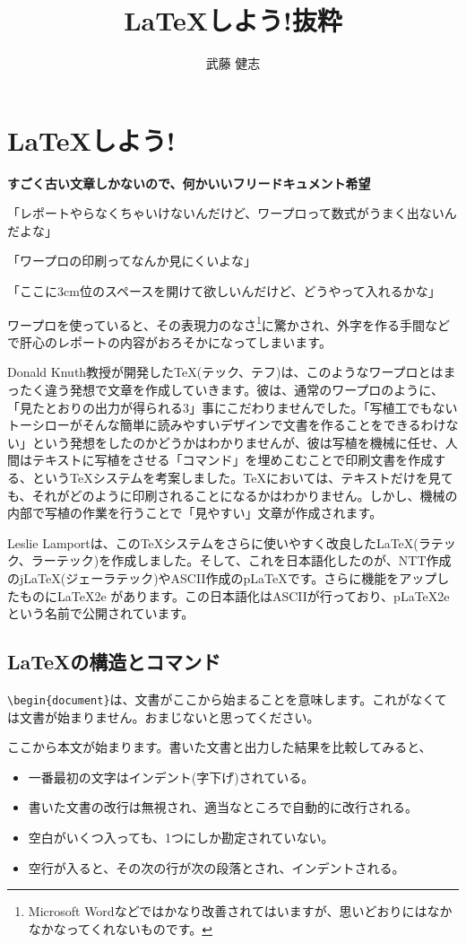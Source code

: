 \documentclass{jsbook}
\title{LaTeXしよう!抜粋}
\author{武藤 健志}
\begin{document}
\chapter{LaTeXしよう!}
\label{chap:latex}

\textbf{すごく古い文章しかないので、何かいいフリードキュメント希望}

「レポートやらなくちゃいけないんだけど、ワープロって数式がうまく出ないんだよな」

「ワープロの印刷ってなんか見にくいよな」

「ここに3cm位のスペースを開けて欲しいんだけど、どうやって入れるかな」

ワープロを使っていると、その表現力のなさ\footnote{Microsoft Wordなどではかなり改善されてはいますが、思いどおりにはなかなかなってくれないものです。}に驚かされ、外字を作る手間などで肝心のレポートの内容がおろそかになってしまいます。

Donald Knuth教授が開発した\TeX (テック、テフ)は、このようなワープロとはまったく違う発想で文章を作成していきます。彼は、通常のワープロのように、「見たとおりの出力が得られる3」事にこだわりませんでした。「写植工でもないトーシローがそんな簡単に読みやすいデザインで文書を作ることをできるわけない」という発想をしたのかどうかはわかりませんが、彼は写植を機械に任せ、人間はテキストに写植をさせる「コマンド」を埋めこむことで印刷文書を作成する、という\TeX システムを考案しました。\TeX においては、テキストだけを見ても、それがどのように印刷されることになるかはわかりません。しかし、機械の内部で写植の作業を行うことで「見やすい」文章が作成されます。 

Leslie Lamportは、この\TeX システムをさらに使いやすく改良した\LaTeX (ラテック、ラーテック)を作成しました。そして、これを日本語化したのが、NTT作成のj\LaTeX (ジェーラテック)やASCII作成のp\LaTeX  です。さらに機能をアップしたものに\LaTeX2e があります。この日本語化はASCIIが行っており、p\LaTeX2e という名前で公開されています。 

\section{LaTeXの構造とコマンド}
\label{sec:latexcmd}

\verb+\begin{document}+は、文書がここから始まることを意味します。これがなくては文書が始まりません。おまじないと思ってください。

ここから本文が始まります。書いた文書と出力した結果を比較してみると、

\begin{itemize}
\item 一番最初の文字はインデント(字下げ)されている。
\item 書いた文書の改行は無視され、適当なところで自動的に改行される。
\item 空白がいくつ入っても、1つにしか勘定されていない。
\item 空行が入ると、その次の行が次の段落とされ、インデントされる。
\end{itemize}
\end{document}
